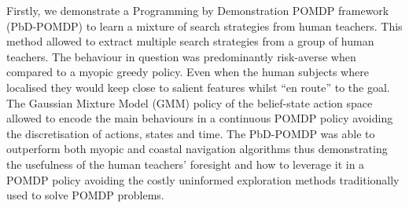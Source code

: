 
%
%
Firstly, we demonstrate a Programming by Demonstration POMDP framework (PbD-POMDP) to learn a mixture of search strategies 
from human teachers. This method allowed to extract multiple search strategies from a group of human teachers. The behaviour
in question was predominantly risk-averse when compared to a myopic greedy policy. Even when the human subjects where localised they 
would keep close to salient features whilst ``en route'' to the goal. The Gaussian Mixture Model (GMM) policy of the belief-state action 
space allowed to encode the main behaviours in a continuous POMDP policy avoiding the discretisation of actions, states and time.
The PbD-POMDP was able to outperform both myopic and coastal navigation algorithms thus demonstrating the usefulness of the human 
teachers' foresight and how to leverage it in a POMDP policy avoiding the costly uninformed exploration methods traditionally 
used to solve POMDP problems.


%
%

